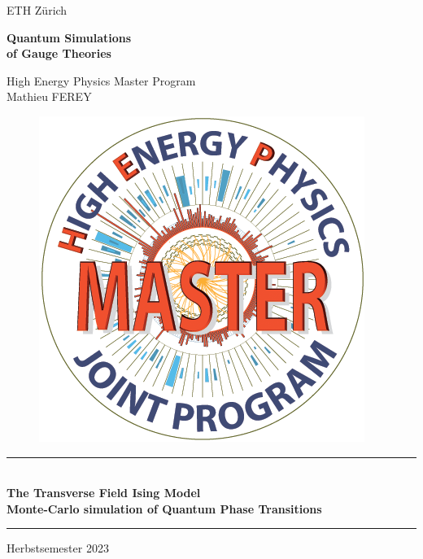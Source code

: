 \begin{titlepage}
    
    \begin{center}
        ETH Zürich
        
        \vspace{1cm}

        \Huge
        \textbf{Quantum Simulations\\\huge of Gauge Theories\\}
        
        \vspace{1.5cm}

        \Large
        High Energy Physics Master Program\\
        Mathieu FEREY 
        
        \begin{figure}[h]
            \centering 
            \includegraphics[scale=0.2]{Images/hep-logo.png}
        \end{figure}
        
        \rule{13cm}{0.5mm}
        \huge
        \textbf{\\The Transverse Field Ising Model\\}
        \vspace{2mm}
        \Large
        \textbf{Monte-Carlo simulation of Quantum Phase Transitions\\}
        \rule{13cm}{0.5mm}
        
        \vspace{5mm}
        Herbstsemester 2023
        

\end{center}
\end{titlepage}
